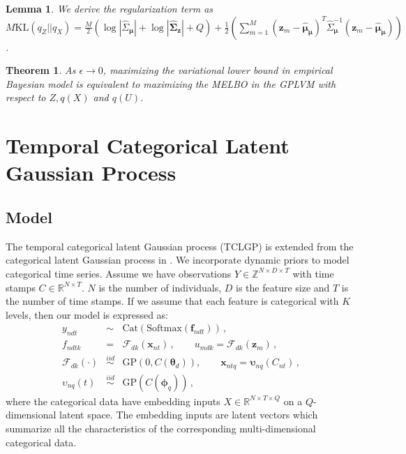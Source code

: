 \documentclass{article}
\newtheorem{lemma}{Lemma}
\newtheorem{theorem}{Theorem}
\begin{document}
\begin{lemma}
	We derive the regularization term as  $M\mathrm{KL}(q_Z || q_X) = \frac{M}{2}(\log |\hat{\Sigma}_{\bm \mu}| + \log|\hat{\bm\Sigma}_{\bm z}| + Q) + \frac{1}{2}\left(\sum_{m = 1}^M(\bm z_m - \hat{\bm \mu}_{\bm \mu})^T\hat{\Sigma}_{\bm\mu}^{-1}(\bm z_m - \hat{\bm \mu}_{\bm \mu})\right)$.
\end{lemma}

\begin{theorem}
	As $\epsilon \rightarrow 0$, maximizing the variational lower bound in empirical Bayesian model is equivalent to maximizing the MELBO in the GPLVM with respect to $Z, q(X)$ and $q(U)$.
\end{theorem}

\section{Temporal Categorical Latent Gaussian Process} \label{sec:TCLGP}
\subsection{Model}
The temporal categorical latent Gaussian process (TCLGP) is extended from the categorical latent Gaussian process in \cite{Gal_2015}. We incorporate dynamic priors \citep{Lawrence_2007_HGP, Damianou_2016} to model categorical time series. Assume we have observations $Y \in \mathbb{Z}^{N\times D \times T}$ with time stamps $C \in \mathbb{R}^{N\times T}$. $N$ is the number of individuals, $D$ is the feature size and $T$ is the number of time stamps. If we assume that each feature is categorical with $K$ levels, then our model is expressed as:
\begin{eqnarray}
y_{ndt} & \sim & \mathrm{Cat}(\mathrm{Softmax}(\bm f_{ndt})) \,, \nonumber \\
f_{ndtk} & = & \mathcal{F}_{dk}(\bm x_{nt}) \,, \qquad u_{mdk} = \mathcal{F}_{dk}(\bm z_{m}) \,, \nonumber \\
\mathcal{F}_{dk}(\cdot) & \stackrel{iid}{\sim} & \mathrm{GP}(0,C(\bm \theta_d)), \qquad \bm x_{ntq} = \bm \upsilon_{nq}(C_{nt}) \,, \nonumber \\
\upsilon_{nq}(t) & \stackrel{iid}{\sim} & \mathrm{GP}(C(\bm{\phi}_q)) \nonumber \,,
\end{eqnarray}
where the categorical data have embedding inputs $X \in \mathbb{R}^{N\times T \times Q}$ on a $Q$-dimensional latent space. The embedding inputs are latent vectors which summarize all the characteristics of the corresponding multi-dimensional categorical data.
\end{document}
